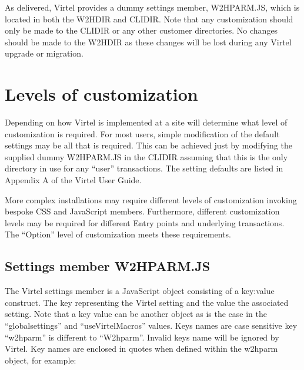 \documentclass[letterpaper,10pt,english]{sphinxmanual}
\begin{document}
\sphinxAtStartPar
As delivered, Virtel provides a dummy settings member, W2HPARM.JS, which is located in both the W2H\sphinxhyphen{}DIR and CLI\sphinxhyphen{}DIR. Note that any customization should only be made to the CLI\sphinxhyphen{}DIR or any other customer directories. No changes should be made to the W2H\sphinxhyphen{}DIR as these changes will be lost during any Virtel upgrade or migration.


\section{Levels of customization}
\label{\detokenize{Customization:levels-of-customization}}
\sphinxAtStartPar
Depending on how Virtel is implemented at a site will determine what level of customization is required. For most users, simple modification of the default settings may be all that is required. This can be achieved just by modifying the supplied dummy W2HPARM.JS in the CLI\sphinxhyphen{}DIR assuming that this is the only directory in use for any “user” transactions. The setting defaults are listed in Appendix A of the Virtel User Guide.

\sphinxAtStartPar
More complex installations may require different levels of customization invoking bespoke CSS and JavaScript members. Furthermore, different customization levels may be required for different Entry points and underlying transactions. The “Option” level of customization meets these requirements.

\ignorespaces 

\subsection{Settings member W2HPARM.JS}
\label{\detokenize{Customization:settings-member-w2hparm-js}}\label{\detokenize{Customization:index-0}}
\sphinxAtStartPar
The Virtel settings member is a JavaScript object consisting of a key:value construct. The key representing the Virtel setting and the value the associated setting. Note that a key value can be another object as is the case in the “global\sphinxhyphen{}settings” and “useVirtelMacros” values. Keys names are case sensitive \sphinxhyphen{} key “w2hparm” is different to “W2hparm”. Invalid keys name will be ignored by Virtel. Key names are enclosed in quotes when defined within the w2hparm object, for example:

\begin{sphinxVerbatim}[commandchars=\\\{\}]
   
\end{sphinxVerbatim}
\end{document}
